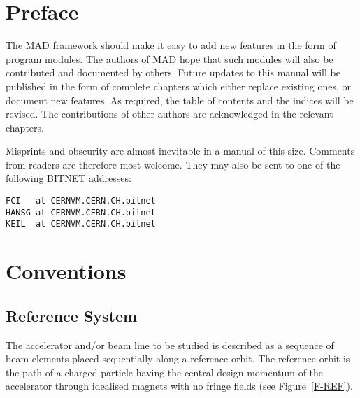 \chapter*{Preface}
\par The MAD framework should make it easy to add new features
in the form of program modules.
The authors of MAD hope that such modules will also be contributed
and documented by others.
Future updates to this manual will be published in the form of
complete chapters which either replace existing ones,
or document new features.
As required, the table of contents and the indices will be revised.
The contributions of other authors are acknowledged in the relevant
chapters.
\par Misprints and obscurity are almost inevitable in a manual
of this size.
Comments from readers are therefore most welcome.
They may also be sent to one of the following BITNET addresses:
\begin{verbatim}
FCI   at CERNVM.CERN.CH.bitnet
HANSG at CERNVM.CERN.CH.bitnet
KEIL  at CERNVM.CERN.CH.bitnet
\end{verbatim}
\cleardoublepage

\tableofcontents
\listoffigures
\listoftables

\cleardoublepage
 
\chapter{Conventions}
\label{S-CONVENT}
 
\section{Reference System}
\label{S-REFER}
The accelerator and/or beam line to be studied is described as
a sequence of beam elements placed sequentially along a reference
orbit.
The reference orbit is the path of a charged particle having the
central design momentum of the accelerator through idealised magnets
with no fringe fields (see Figure~\ref{F-REF}).
 
